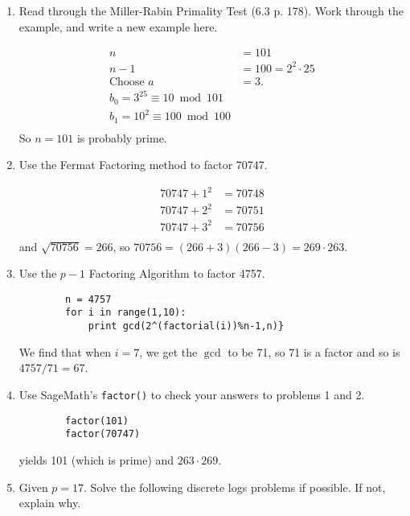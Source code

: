\documentclass[12pt]{amsart}
\theoremstyle{plain}
\theoremstyle{definition}
\begin{document}
\begin{enumerate}[1.]
	\item Read through the Miller-Rabin Primality Test (6.3 p. 178).  Work through the example, and write a new example here.\\
		\begin{framed}
		\begin{align*}
		n &= 101\\
		n-1 &= 100 = 2^2\cdot 25\\
		\text{Choose } a &= 3.\\
		b_0 = 3^{25} \equiv 10 \bmod 101\\
		b_1 = 10^2 \equiv 100 \bmod 100\\
		\end{align*}
		So $n = 101$ is probably prime.\\
		\end{framed}
	\item Use the Fermat Factoring method to factor 70747.\\
		\begin{framed}
		\begin{align*}
		70747+1^2 &= 70748\\
		70747+2^2 &= 70751\\
		70747+3^2 &= 70756\\
		\end{align*}
		and $\sqrt{70756} = 266$, so $70756 = (266+3)(266-3) = 269\cdot 263$.
		\end{framed}
	\item Use the $p-1$ Factoring Algorithm to factor 4757.\\ 
		\begin{framed}
		\begin{lstlisting}
		n = 4757
		for i in range(1,10):
			print gcd(2^(factorial(i))%n-1,n)}
		\end{lstlisting}
		We find that when $i = 7$, we get the $\gcd$ to be 71, so 71 is a factor and so is $4757/71 = 67$.
		\end{framed}
	\item Use SageMath's \texttt{factor()} to check your answers to problems 1 and 2.\\
		\begin{framed}
		\begin{lstlisting}
		factor(101)
		factor(70747)
		\end{lstlisting}
		yields 101 (which is prime) and $263\cdot 269$.
		\end{framed}
	\item Given $p = 17$.  Solve the following discrete logs problems if possible.  If not, explain why.

\end{enumerate}
\end{document}

